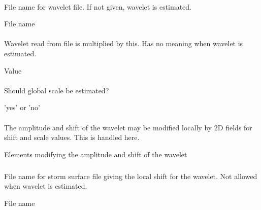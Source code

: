 \paragraph{}
 \slist
   \item \Description File name for wavelet file. If not given, wavelet is estimated.
   \item \Argument File name
   \item \Default
 \elist

\paragraph{}
 \slist
   \item \Description Wavelet read from file is multiplied by this. Has no meaning when wavelet is estimated.
   \item \Argument Value
   \item \Default
 \elist

\paragraph{}
 \slist
   \item \Description Should global scale be estimated?
   \item \Argument 'yes' or 'no'
   \item \Default
 \elist

\paragraph{}
 \slist
   \item \Description The amplitude and shift of the wavelet may be modified locally by 2D fields for shift and scale values. This is handled here.
   \item \Argument Elements modifying the amplitude and shift of the wavelet
   \item \Default
 \elist

\subparagraph{}
 \slist
   \item \Description File name for storm surface file giving the local shift for the wavelet. Not allowed when wavelet is estimated.
   \item \Argument File name
   \item \Default
 \elist

